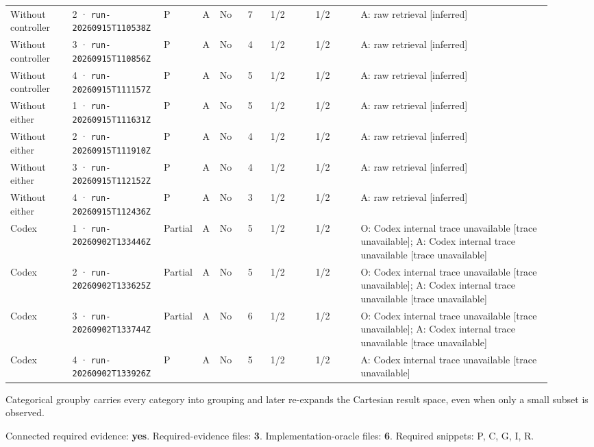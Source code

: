 \begin{landscape}
\begin{longtable}{@{}L{0.11\linewidth}L{0.16\linewidth}*{2}{L{0.022\linewidth}}L{0.05\linewidth}L{0.045\linewidth}L{0.08\linewidth}L{0.085\linewidth}L{0.346\linewidth}@{}}
Without controller & 2 · \texttt{run-20260915\allowbreak T110538Z} & P & A & No & 7 & 1/2 & 1/2 & A: raw retrieval [inferred] \\
Without controller & 3 · \texttt{run-20260915\allowbreak T110856Z} & P & A & No & 4 & 1/2 & 1/2 & A: raw retrieval [inferred] \\
Without controller & 4 · \texttt{run-20260915\allowbreak T111157Z} & P & A & No & 5 & 1/2 & 1/2 & A: raw retrieval [inferred] \\
Without either & 1 · \texttt{run-20260915\allowbreak T111631Z} & P & A & No & 5 & 1/2 & 1/2 & A: raw retrieval [inferred] \\
Without either & 2 · \texttt{run-20260915\allowbreak T111910Z} & P & A & No & 4 & 1/2 & 1/2 & A: raw retrieval [inferred] \\
Without either & 3 · \texttt{run-20260915\allowbreak T112152Z} & P & A & No & 4 & 1/2 & 1/2 & A: raw retrieval [inferred] \\
Without either & 4 · \texttt{run-20260915\allowbreak T112436Z} & P & A & No & 3 & 1/2 & 1/2 & A: raw retrieval [inferred] \\
Codex & 1 · \texttt{run-20260902\allowbreak T133446Z} & Partial & A & No & 5 & 1/2 & 1/2 & O: Codex internal trace unavailable [trace unavailable]; A: Codex internal trace unavailable [trace unavailable] \\
Codex & 2 · \texttt{run-20260902\allowbreak T133625Z} & Partial & A & No & 5 & 1/2 & 1/2 & O: Codex internal trace unavailable [trace unavailable]; A: Codex internal trace unavailable [trace unavailable] \\
Codex & 3 · \texttt{run-20260902\allowbreak T133744Z} & Partial & A & No & 6 & 1/2 & 1/2 & O: Codex internal trace unavailable [trace unavailable]; A: Codex internal trace unavailable [trace unavailable] \\
Codex & 4 · \texttt{run-20260902\allowbreak T133926Z} & P & A & No & 5 & 1/2 & 1/2 & A: Codex internal trace unavailable [trace unavailable] \\
\end{longtable}
\endgroup
\end{landscape}

\label{sec:pandas-dev-pandas-14942}

Categorical groupby carries every category into grouping and later re-expands the Cartesian result space, even when only a small subset is observed.

Connected required evidence: \textbf{yes}. Required-evidence files: \textbf{3}. Implementation-oracle files: \textbf{6}. Required snippets: P, C, G, I, R.

